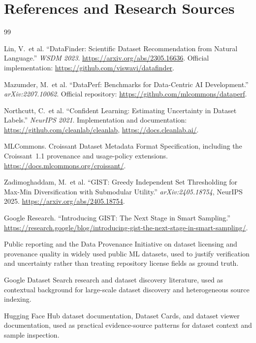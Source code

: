 \documentclass[11pt]{article}
\begin{document}
\section{References and Research Sources}
\begin{thebibliography}{99}

 Lin, V.\ et al. ``DataFinder: Scientific Dataset Recommendation from Natural
Language.'' \textit{WSDM 2023}. \url{https://arxiv.org/abs/2305.16636}. Official implementation:
\url{https://github.com/viswavi/datafinder}.

 Mazumder, M.\ et al. ``DataPerf: Benchmarks for Data-Centric AI Development.''
\textit{arXiv:2207.10062}. Official repository: \url{https://github.com/mlcommons/dataperf}.

 Northcutt, C.\ et al. ``Confident Learning: Estimating Uncertainty in Dataset
Labels.'' \textit{NeurIPS 2021}. Implementation and documentation: \url{https://github.com/cleanlab/cleanlab},
\url{https://docs.cleanlab.ai/}.

 MLCommons. Croissant Dataset Metadata Format Specification, including the
Croissant~1.1 provenance and usage-policy extensions. \url{https://docs.mlcommons.org/croissant/}.

 Zadimoghaddam, M.\ et al. ``GIST: Greedy Independent Set Thresholding for Max-Min
Diversification with Submodular Utility.'' \textit{arXiv:2405.18754}, NeurIPS 2025.
\url{https://arxiv.org/abs/2405.18754}.

 Google Research. ``Introducing GIST: The Next Stage in Smart Sampling.''
\url{https://research.google/blog/introducing-gist-the-next-stage-in-smart-sampling/}.

 Public reporting and the Data Provenance Initiative on dataset licensing and
provenance quality in widely used public ML datasets, used to justify verification and uncertainty
rather than treating repository license fields as ground truth.

 Google Dataset Search research and dataset discovery literature, used as
contextual background for large-scale dataset discovery and heterogeneous source indexing.

 Hugging Face Hub dataset documentation, Dataset Cards, and dataset viewer
documentation, used as practical evidence-source patterns for dataset context and sample inspection.


\end{thebibliography}
\end{document}
